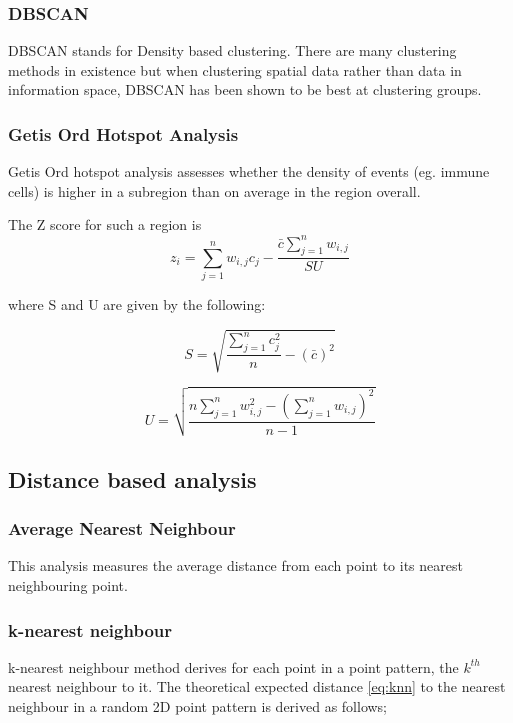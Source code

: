 \subsubsection{DBSCAN}
DBSCAN stands for Density based clustering. There are many clustering methods in existence but when clustering spatial data rather than data in information space, DBSCAN has been shown to be best at clustering groups\cite{}.

\subsubsection{Getis Ord Hotspot Analysis}
Getis Ord hotspot analysis assesses whether the density of events (eg. immune cells) is higher in a subregion than on average in the region overall. 

The Z score for such a region is 
\begin{equation}
    z_i = \sum_{j=1}^{n}w_{i,j}c_{j} - \frac{\bar{c}\sum_{j=1}^{n}w_{i,j}}{SU}
\end{equation}

where S and U are given by the following:

\begin{equation}
    S = \sqrt{\frac{\sum_{j=1}^{n}c_{j}^2}{n} - (\bar{c})^2 }
\end{equation}

\begin{equation}
    U = \sqrt{\frac{n\sum_{j=1}^{n}w_{i,j}^2 - (\sum^n_{j=1}w_{i,j})^2}{n-1} }
\end{equation}


\subsection{Distance based analysis}
\subsubsection{Average Nearest Neighbour}
This analysis measures the average distance from each point to its nearest neighbouring point. 

\subsubsection{k-nearest neighbour}
k-nearest neighbour method derives for each point in a point pattern, the $k^{th}$ nearest neighbour to it.
The theoretical expected distance \ref{eq:knn} to the nearest neighbour in a random 2D point pattern is derived as follows;

